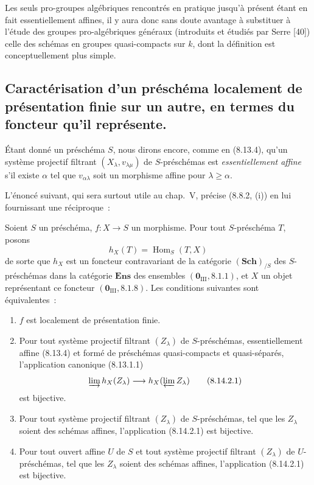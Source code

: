 \begin{remark}[8.13.6]
Les seuls pro-groupes algébriques rencontrés en pratique jusqu'à présent étant
en fait essentiellement affines, il y aura donc sans doute avantage à
substituer à l'étude des groupes pro-algébriques généraux (introduits et
étudiés par Serre [40]) celle des schémas en groupes quasi-compacts sur $k$,
dont la définition est conceptuellement plus simple.
\end{remark}

\subsection{Caractérisation d'un préschéma localement de présentation finie sur un autre, en termes du foncteur qu'il représente.}
\label{subsection:IV.8.14-fr}

\begin{env}[8.14.1]
\label{IV.8.14.1-fr}
Étant donné un préschéma $S$, nous dirons encore, comme en (8.13.4), qu'un
système projectif filtrant $(X_\lambda,v_{\lambda\mu})$ de $S$-préschémas est
\emph{essentiellement affine} s'il existe $\alpha$ tel que
$v_{\alpha\lambda}$ soit un morphisme affine pour $\lambda\geqslant\alpha$.

L'énoncé suivant, qui sera surtout utile au chap.~V, précise (8.8.2, (i)) en
lui fournissant une réciproque~:
\end{env}

\begin{proposition}[8.14.2]
\label{IV.8.14.2-fr}
Soient $S$ un préschéma, $f:X\to S$ un morphisme. Pour tout $S$-préschéma
$T$, posons
\[
h_X(T)=\operatorname{Hom}_S(T,X)
\]
de sorte que $h_X$ est un foncteur contravariant de la catégorie
$(\mathbf{Sch})_{/S}$ des $S$-préschémas dans la catégorie
$\mathbf{Ens}$ des ensembles $(\mathbf 0_{\mathrm{III}},8.1.1)$, et $X$ un
objet représentant ce foncteur $(\mathbf 0_{\mathrm{III}},8.1.8)$. Les
conditions suivantes sont équivalentes~:
\begin{enumerate}[label=\emph{\alph*)}]
  \item $f$ est localement de présentation finie.
  \item Pour tout système projectif filtrant $(Z_\lambda)$ de
  $S$-préschémas, essentiellement affine \textup{(8.13.4)} et formé de préschémas
  quasi-compacts et quasi-séparés, l'application canonique \textup{(8.13.1.1)}
\begin{equation}
\label{IV.8.14.2.1-fr}
\varinjlim h_X(Z_\lambda)
\longrightarrow h_X(\varprojlim Z_\lambda) \tag{8.14.2.1}
\end{equation}
  est bijective.
  \item Pour tout système projectif filtrant $(Z_\lambda)$ de
  $S$-préschémas, tel que les $Z_\lambda$ soient des schémas affines,
  l'application \textup{(8.14.2.1)} est bijective.
  \item[\rm c$'$)] Pour tout ouvert affine $U$ de $S$ et tout système
  projectif filtrant $(Z_\lambda)$ de $U$-préschémas, tel que les $Z_\lambda$
  soient des schémas affines, l'application \textup{(8.14.2.1)} est bijective.
\end{enumerate}
\end{proposition}

